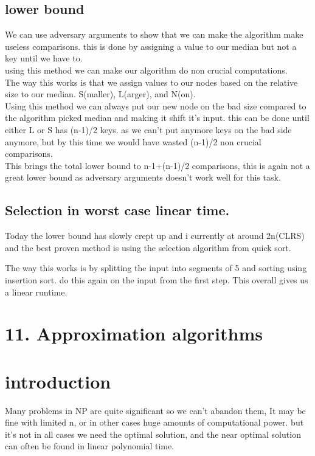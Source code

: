 \documentclass[a4paper,10pt,titlepage]{report}
\begin{document}
\subsection{lower bound}

We can use adversary arguments to show that we can make the algorithm make useless comparisons. this is done by assigning a value to our median but not a key until we have to. \\ using this method we can make our algorithm do non crucial computations.\\
The way this works is that we assign values to our nodes based on the relative size to our median. S(maller), L(arger), and N(on). \\
Using this method we can always put our new node on the bad size compared to the algorithm picked median and making it shift it's input. this can be done until either L or S has (n-1)/2 keys. as we can't put anymore keys on the bad side anymore, but by this time we would have wasted (n-1)/2 non crucial comparisons.\\

This brings the total lower bound to n-1+(n-1)/2 comparisons, this is again not a great lower bound as adversary arguments doesn't work well for this task.

\subsection{Selection in worst case linear time.}
Today the lower bound has slowly crept up and i currently at around 2n(CLRS) and the best proven method is using the selection algorithm from quick sort.

The way this works is by splitting the input into segments of 5 and sorting using insertion sort. do this again on the input from the first step. 
This overall gives us a linear runtime.



\newpage
\section{11. Approximation algorithms}

\section{introduction}
Many problems in NP are quite significant so we can't abandon them, It may be fine with limited n, or in other cases huge amounts of computational power. but it's not in all cases we need the optimal solution, and the near optimal solution can often be found in linear polynomial time.
\end{document}
